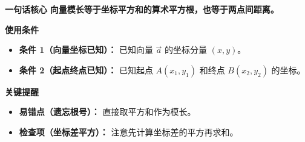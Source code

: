 \begin{summarybox}
	\textbf{\textcolor{CSummary}{一句话核心}}
	\textbf{向量模长等于坐标平方和的算术平方根，也等于两点间距离。}

	\medskip
	\textbf{\textcolor{CSummary}{使用条件}}
	\begin{itemize}[leftmargin=*, itemsep=0.5em, topsep=0.4em]
		\item \textbf{条件 1（向量坐标已知）：} 已知向量 $\vec{a}$ 的坐标分量 $(x,y)$。
		\item \textbf{条件 2（起点终点已知）：} 已知起点 $A(x_1,y_1)$ 和终点 $B(x_2,y_2)$ 的坐标。
	\end{itemize}

	\medskip
	\textbf{\textcolor{CSummary}{关键提醒}}
	\begin{itemize}[leftmargin=*, itemsep=0.5em, topsep=0.4em]
		\item \textbf{易错点（遗忘根号）：} 直接取平方和作为模长。
		\item \textbf{检查项（坐标差平方）：} 注意先计算坐标差的平方再求和。
	\end{itemize}

\end{summarybox}
